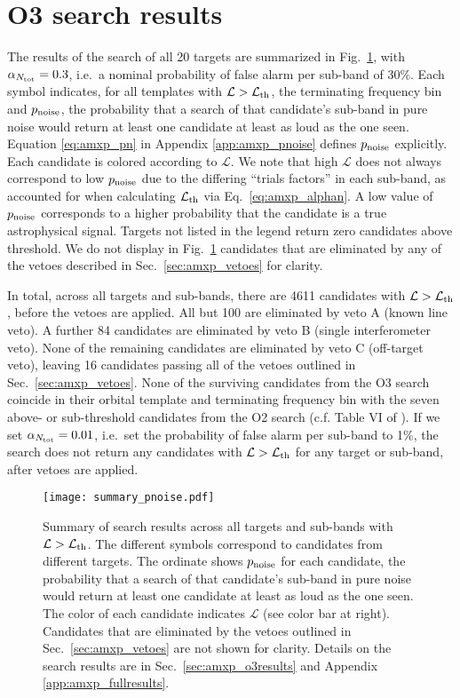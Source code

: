 \section{O3 search results \label{sec:amxp_o3results}} 
The results of the search of all 20 targets are summarized in Fig.~\ref{fig:amxp_summary}, with $\alpha_{N_{\rm tot}}=0.3$, i.e.~a nominal probability of false alarm per sub-band of 30\%. Each symbol indicates, for all templates with $\mathcal{L} > \mathcal{L}_{\rm th}$, the terminating frequency bin and $p_{\rm noise}$, the probability that a search of that candidate's sub-band in pure noise would return at least one candidate at least as loud as the one seen. Equation \eqref{eq:amxp_pn} in Appendix \ref{app:amxp_pnoise} defines $p_{\rm noise}$ explicitly. Each candidate is colored according to $\mathcal{L}$. We note that high $\mathcal{L}$ does not always correspond to low $p_{\rm noise}$ due to the differing ``trials factors'' in each sub-band, as accounted for when calculating $\mathcal{L}_{\rm th}$ via Eq.~\eqref{eq:amxp_alphan}. A low value of $p_{\rm noise}$ corresponds to a higher probability that the candidate is a true astrophysical signal. Targets not listed in the legend return zero candidates above threshold. We do not display in Fig.~\ref{fig:amxp_summary} candidates that are eliminated by any of the vetoes described in Sec.~\ref{sec:amxp_vetoes} for clarity. 

In total, across all targets and sub-bands, there are 4611 candidates with $\mathcal{L} > \mathcal{L}_{\rm th}$, before the vetoes are applied. All but 100 are eliminated by veto A (known line veto). A further 84 candidates are eliminated by veto B (single interferometer veto). None of the remaining candidates are eliminated by veto C (off-target veto), leaving 16 candidates passing all of the vetoes outlined in Sec.~\ref{sec:amxp_vetoes}. None of the surviving candidates from the O3 search coincide in their orbital template and terminating frequency bin with the seven above- or sub-threshold candidates from the O2 search (c.f. Table VI of \citet{Middleton2020}). If we set $\alpha_{N_{\rm tot}}=0.01$, i.e.~set the probability of false alarm per sub-band to 1\%, the search does not return any candidates with $\mathcal{L}>\mathcal{L}_{\rm th}$ for any target or sub-band, after vetoes are applied.

\begin{figure*}
	\centering
	\texttt{[image: summary\_pnoise.pdf]}
	\caption{Summary of search results across all targets and sub-bands with $\mathcal{L} > \mathcal{L}_{\rm th}$. The different symbols correspond to candidates from different targets. The ordinate shows $p_{\rm noise}$ for each candidate, the probability that a search of that candidate's sub-band in pure noise would return at least one candidate at least as loud as the one seen. The color of each candidate indicates $\mathcal{L}$ (see color bar at right). Candidates that are eliminated by the vetoes outlined in Sec.~\ref{sec:amxp_vetoes} are not shown for clarity. Details on the search results are in Sec.~\ref{sec:amxp_o3results} and Appendix \ref{app:amxp_fullresults}.}
	\label{fig:amxp_summary}
\end{figure*}

